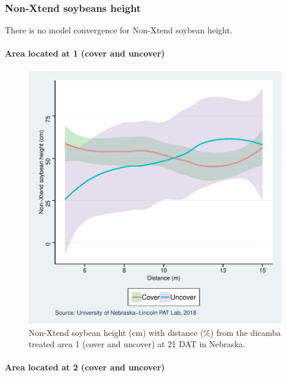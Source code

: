 \documentclass[]{article}
\let\oldparagraph\paragraph
\renewcommand{\paragraph}[1]{\oldparagraph{#1}\mbox{}}
\begin{document}
\newpage

\pagebreak

\subsubsection{Non-Xtend soybeans
height}\label{non-xtend-soybeans-height-4}

There is no model convergence for Non-Xtend soybean height.

\paragraph{Area located at 1 (cover and
uncover)}\label{area-located-at-1-cover-and-uncover}

\begin{figure}
\centering
\includegraphics{Report_Dicamba_study_files/figure-latex/unnamed-chunk-76-1.pdf}
\caption{Non-Xtend soybean height (cm) with distance (\%) from the
dicamba treated area 1 (cover and uncover) at 21 DAT in Nebraska.}
\end{figure}

\newpage

\pagebreak

\paragraph{Area located at 2 (cover and
uncover)}\label{area-located-at-2-cover-and-uncover}
\end{document}
